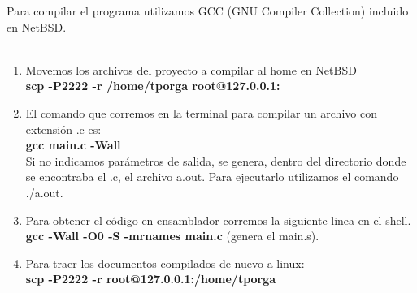 \documentclass[a4paper,10pt]{article}
\begin{document}
Para compilar el programa utilizamos GCC (GNU Compiler Collection) incluido en NetBSD.\\
\\
\begin{enumerate}[1.]
	\item Movemos los archivos del proyecto a compilar al home en NetBSD\\
	\textbf{scp -P2222 -r /home/tporga root@127.0.0.1:~}

	\item El comando que corremos en la terminal para compilar un archivo con extensi\'on .c es:\\
	\textbf{gcc main.c -Wall}\\
	Si no indicamos par\'ametros de salida, se genera, dentro del directorio donde se encontraba el .c, el archivo  a.out. Para ejecutarlo utilizamos el comando ./a.out.\\

	\item Para obtener el c\'odigo en ensamblador corremos la siguiente linea en el shell.\\
	\textbf{gcc -Wall -O0 -S -mrnames main.c}  (genera el main.s).

	\item Para traer los documentos compilados de nuevo a linux:\\
	\textbf{scp -P2222 -r root@127.0.0.1:/home/tporga ~}
\end{enumerate}
\end{document}
